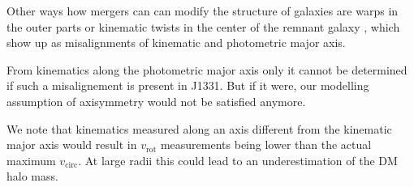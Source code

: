 Other ways how mergers can can modify the structure of galaxies are warps in the outer parts or kinematic twists in the center of the remnant galaxy \citep{2013pss5.book..923S}, which show up as misalignments of kinematic and photometric major axis.

From kinematics along the photometric major axis only it cannot be determined if such a misalignement is present in J1331. But if it were, our modelling assumption of axisymmetry would not be satisfied anymore. 

We note that kinematics measured along an axis different from the kinematic major axis would result in $v_\text{rot}$ measurements being lower than the actual maximum $v_\text{circ}$. At large radii this could lead to an underestimation of the DM halo mass.